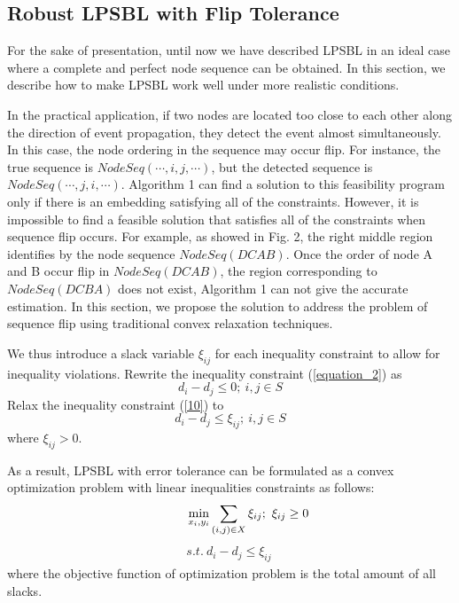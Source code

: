 \subsection{Robust LPSBL with Flip Tolerance }

For the sake of presentation, until now we have described LPSBL in an ideal case where a complete and perfect node sequence can be obtained. 
In this section, we describe how to make LPSBL work well under more realistic conditions. 

In the practical application, if two nodes are located too close to each other along the direction of event propagation, they detect the event almost simultaneously. 
In this case, the node ordering in the sequence may occur flip. 
For instance, the true sequence is $NodeSeq ( \cdots ,i,j, \cdots )$, but the detected sequence is $NodeSeq ( \cdots ,j,i, \cdots )$.
Algorithm 1 can find a solution to this feasibility program only if there is an embedding satisfying all of the constraints. 
However, it is impossible to find a feasible solution that satisfies all of the constraints when sequence flip occurs. 
For example, as showed in Fig. 2, the right middle region identifies by the node sequence $NodeSeq (D C A B)$. 
Once the order of node A and B occur flip in $NodeSeq (D C A B)$, the region corresponding to $NodeSeq (D C B A)$ does not exist, Algorithm 1 can not give the accurate estimation.
In this section, we propose the solution to address the problem of sequence flip using traditional convex relaxation techniques.


We thus introduce a slack variable ${\xi _{ij}}$ for each inequality constraint to allow for inequality violations.
Rewrite the inequality constraint (\ref{equation_2}) as
 \begin{equation} \label{10}
 d_i - d_j  \le  0 ; \  i,j \in S
 \end{equation}
 Relax the inequality constraint (\ref{10}) to
 \begin{equation} \label{11}
 d_i - d_j  \le  \xi _{ij} ; \  i,j \in S
 \end{equation}
 where
 \begin{math}
 \xi _{ij}  > 0
 \end{math}.
 
As a result, LPSBL with error tolerance can be formulated as a convex optimization problem with linear inequalities constraints as follows:
 \begin{equation} \label{5}
\quad \quad \quad \mathop {\min }\limits_{{x_i},{y_i}} \sum\limits_{(i,j) \in X} {{\xi _{ij}}};\  \xi _{ij} \ge 0\\
  \end{equation}
  \begin{align*}
 s.t.\   d_i - d_j  \le  \xi _{ij} \
\end{align*}
where the objective function of optimization problem is the total amount of all slacks. 


